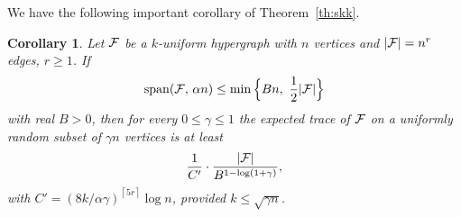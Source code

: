 \documentclass[11pt]{article}
\makeatletter
\renewenvironment{proof}[1][\proofname]
{\par\pushQED{\qed}
	\normalfont\topsep6\p@\@plus6\p@\relax\trivlist
	\item[\hskip\labelsep\bfseries#1\@addpunct{.}]
	\ignorespaces}
{\popQED\endtrivlist\@endpefalse}
\newtheorem{coro}[theo]{Corollary}
\newtheorem{remark}[theo]{Remark}
\newcommand{\FF}{{\cal F}}
\newcommand{\ceil}[1]{\left\lceil #1 \right\rceil}
\renewcommand{\wp}{\mathrm{span}}
\renewcommand{\a}{\alpha}
\newcommand{\g}{\gamma}
\makeatother
\begin{document}



We have the following important corollary of Theorem~\ref{th:skk}.

\begin{coro}%
	\label{co:exptr}
	Let $\FF$ be a $k$-uniform hypergraph with $n$ vertices and $|\FF|=n^r$ edges, $r \ge 1$. 
	If 
	$$\wp(\FF,\,\a n) \le \min\Big\{B n,\,\, \frac12|\FF|\Big\}$$
	with real $B>0$, then for every $0 \le \gamma \le 1$ the expected trace of $\FF$ on a 
	uniformly random subset
	of $\g n$ vertices is at least
	$$\frac{1}{C'} \cdot \frac{|\FF|}{B^{1-\log(1+\gamma)}},$$
	with $C' = (8k/\a\g)^{\ceil{5r}}\log n$, provided $k \le \sqrt{\g n}$.
	\end{coro}
	
\end{document}
